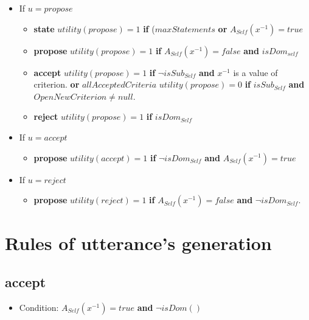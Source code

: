 \documentclass{article}
\begin{document}
\begin{itemize}
\begin{itemize}
		\end{itemize}	
		
		\item If $u =propose$
		\begin{itemize}
			\item \textbf{state}
			\subitem $utility(propose) = 1$ \textbf{ if }  ($maxStatements$ \textbf{ or } $A_{Self} (x^{-1}) = true$
			
			\item \textbf{propose}
			\subitem $utility(propose) = 1$ \textbf{ if } $A_{Self} (x^{-1})= false$ \textbf{ and } $isDom_{self}$
			
			\item \textbf{accept}
			\subitem $utility(propose) = 1$ \textbf{ if } $ \neg isSub_{Self}$ \textbf{ and } $x^{-1}$ is a value of criterion. \textbf{ or } $allAcceptedCriteria$
			\subitem $utility(propose) = 0$  \textbf{ if } $isSub_{Self}$ \textbf{ and } $OpenNewCriterion \not= null$.
			\item \textbf{reject}
			\subitem $utility(propose) = 1$ \textbf{ if } $isDom_{Self}$
			
		\end{itemize}
		
		\item If $u =accept$
		\begin{itemize}
			\item \textbf{propose}	
			\subitem $utility(accept) = 1$ \textbf{ if } $ \neg isDom_{Self}$ \textbf{ and }  $A_{Self} (x^{-1}) = true$ 
			
			
		\end{itemize}
		
		\item If $u =reject$
		\begin{itemize}
			\item \textbf{propose}	
			\subitem $utility(reject) = 1$  \textbf{ if } $A_{Self} (x^{-1}) = false$ \textbf{ and } $\neg isDom_{Self}$.
			
			
		\end{itemize}
	\end{itemize}
	
	\section{Rules of utterance's generation}
	\subsection{accept}
	\begin{itemize}
		\item Condition: $A_{Self} (x^{-1}) = true$ \textbf{ and } $\neg isDom()$
	\end{itemize}
	
\end{document}
